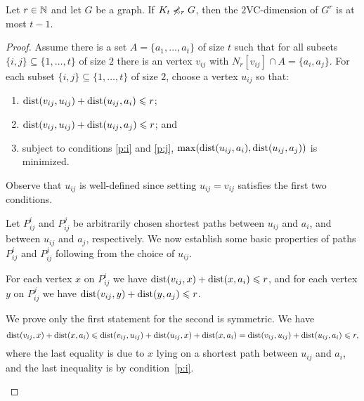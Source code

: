 \begin{theorem}
Let $r\in \mathbb{N}$ and let $G$ be a graph. 
If $K_t\not\preccurlyeq_r G$, then the $2$VC-dimension of $G^r$
is at most $t-1$. 
\end{theorem}
\begin{proof}
Assume there is a set $A=\{a_1,\ldots, a_t\}$ of size $t$ such that
for all subsets $\{i,j\}\subseteq \{1,\ldots,t\}$ of size $2$ 
there is an vertex $v_{ij}$ with 
$N_r[v_{ij}]\cap A=\{a_i,a_j\}$.
For each subset $\{i,j\}\subseteq \{1,\ldots,t\}$ of size $2$, choose a vertex $u_{ij}$ so that:
\begin{enumerate}[(1)]
\item\label{p:i} $\mathrm{dist}(v_{ij},u_{ij})+\mathrm{dist}(u_{ij},a_i)\leqslant r$;
\item\label{p:j} $\mathrm{dist}(v_{ij},u_{ij})+\mathrm{dist}(u_{ij},a_j)\leqslant r$; and
\item\label{p:min} subject to conditions \eqref{p:i} and \eqref{p:j}, $\max(\mathrm{dist}(u_{ij},a_i),\mathrm{dist}(u_{ij},a_j))$ is minimized.
\end{enumerate}
Observe that $u_{ij}$ is well-defined since setting $u_{ij}=v_{ij}$ satisfies the first two conditions.

Let $P^i_{ij}$ and $P^j_{ij}$ be arbitrarily chosen shortest paths between $u_{ij}$ and $a_i$, and between $u_{ij}$ and $a_j$, respectively.
We now establish some basic properties of paths $P^i_{ij}$ and $P^j_{ij}$ following from the choice of $u_{ij}$.

\begin{claim}\label{cl:ineq}
For each vertex $x$ on $P^i_{ij}$ we have $\mathrm{dist}(v_{ij},x)+\mathrm{dist}(x,a_i)\leqslant r$, and
for each vertex $y$ on $P^j_{ij}$ we have $\mathrm{dist}(v_{ij},y)+\mathrm{dist}(y,a_j)\leqslant r$.
\end{claim}
\begin{clproof}
We prove only the first statement for the second is symmetric.
We have
$$\mathrm{dist}(v_{ij},x)+\mathrm{dist}(x,a_{i})\leqslant \mathrm{dist}(v_{ij},u_{ij})+\mathrm{dist}(u_{ij},x)+\mathrm{dist}(x,a_{i})=\mathrm{dist}(v_{ij},u_{ij})+\mathrm{dist}(u_{ij},a_{i})\leqslant r,$$
where the last equality is due to $x$ lying on a shortest path between $u_{ij}$ and $a_i$, and the last inequality is by condition~\eqref{p:i}.
\end{clproof}


\end{proof}
